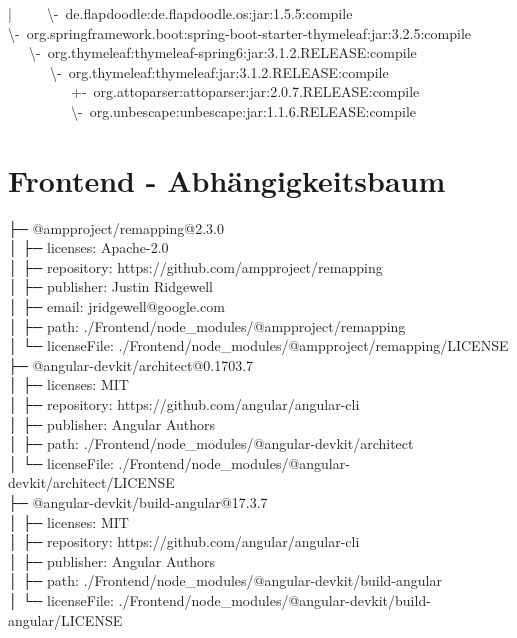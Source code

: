 |~~~~~\textbackslash-~de.flapdoodle:de.flapdoodle.os:jar:1.5.5:compile\\
\textbackslash-~org.springframework.boot:spring-boot-starter-thymeleaf:jar:3.2.5:compile\\
~~~\textbackslash-~org.thymeleaf:thymeleaf-spring6:jar:3.1.2.RELEASE:compile\\
~~~~~~\textbackslash-~org.thymeleaf:thymeleaf:jar:3.1.2.RELEASE:compile\\
~~~~~~~~~+-~org.attoparser:attoparser:jar:2.0.7.RELEASE:compile\\
~~~~~~~~~\textbackslash-~org.unbescape:unbescape:jar:1.1.6.RELEASE:compile\\

\section{Frontend - Abhängigkeitsbaum}\label{sec:frontend---abhangigkeitsbaum}
├─ @ampproject/remapping@2.3.0\\
│  ├─ licenses: Apache-2.0\\
│  ├─ repository: https://github.com/ampproject/remapping\\
│  ├─ publisher: Justin Ridgewell\\
│  ├─ email: jridgewell@google.com\\
│  ├─ path: ./Frontend/node\_modules/@ampproject/remapping\\
│  └─ licenseFile: ./Frontend/node\_modules/@ampproject/remapping/LICENSE\\
├─ @angular-devkit/architect@0.1703.7\\
│  ├─ licenses: MIT\\
│  ├─ repository: https://github.com/angular/angular-cli\\
│  ├─ publisher: Angular Authors\\
│  ├─ path: ./Frontend/node\_modules/@angular-devkit/architect\\
│  └─ licenseFile: ./Frontend/node\_modules/@angular-devkit/architect/LICENSE\\
├─ @angular-devkit/build-angular@17.3.7\\
│  ├─ licenses: MIT\\
│  ├─ repository: https://github.com/angular/angular-cli\\
│  ├─ publisher: Angular Authors\\
│  ├─ path: ./Frontend/node\_modules/@angular-devkit/build-angular\\
│  └─ licenseFile: ./Frontend/node\_modules/@angular-devkit/build-angular/LICENSE\\
